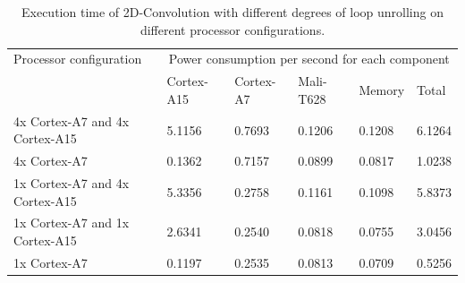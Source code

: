\begin{table}[H]
  \begin{tabular}{llllll}
    \toprule
    Processor configuration         & \multicolumn{5}{c}{Power consumption per second for each component} \\
                                    & Cortex-A15  & Cortex-A7 & Mali-T628 & Memory  & Total \\
    \midrule
    4x Cortex-A7 and 4x Cortex-A15  & 5.1156          & 0.7693        & 0.1206        & 0.1208  & 6.1264 \\
    4x Cortex-A7                    & 0.1362          & 0.7157        & 0.0899        & 0.0817  & 1.0238 \\
    1x Cortex-A7 and 4x Cortex-A15  & 5.3356          & 0.2758        & 0.1161        & 0.1098  & 5.8373 \\
    1x Cortex-A7 and 1x Cortex-A15  & 2.6341          & 0.2540        & 0.0818        & 0.0755  & 3.0456 \\
    1x Cortex-A7                    & 0.1197          & 0.2535        & 0.0813        & 0.0709  & 0.5256 \\
    \bottomrule
  \end{tabular}
  \caption{Execution time of 2D-Convolution with different degrees of loop unrolling on different processor configurations. \label{overflow}}
\end{table}

